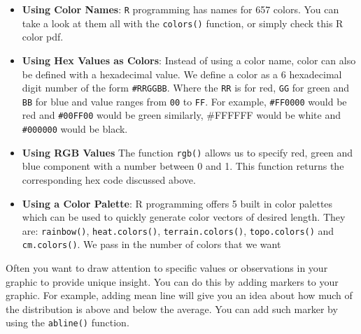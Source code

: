 \documentclass[
]{book}
\newenvironment{Shaded}{\begin{snugshade}}{\end{snugshade}}
\newcommand{\DataTypeTok}[1]{\textcolor[rgb]{0.13,0.29,0.53}{#1}}
\newcommand{\DecValTok}[1]{\textcolor[rgb]{0.00,0.00,0.81}{#1}}
\newcommand{\KeywordTok}[1]{\textcolor[rgb]{0.13,0.29,0.53}{\textbf{#1}}}
\newcommand{\NormalTok}[1]{#1}
\newcommand{\OperatorTok}[1]{\textcolor[rgb]{0.81,0.36,0.00}{\textbf{#1}}}
\newcommand{\StringTok}[1]{\textcolor[rgb]{0.31,0.60,0.02}{#1}}
\begin{document}
\begin{itemize}
\item
  \textbf{Using Color Names}: \texttt{R} programming has names for 657 colors. You can take a look at them all with the \texttt{colors()} function, or simply check this R color pdf.
\item
  \textbf{Using Hex Values as Colors}: Instead of using a color name, color can also be defined with a hexadecimal value. We define a color as a 6 hexadecimal digit number of the form \texttt{\#RRGGBB}. Where the \texttt{RR} is for red, \texttt{GG} for green and \texttt{BB} for blue and value ranges from \texttt{00} to \texttt{FF}. For example, \texttt{\#FF0000} would be red and \texttt{\#00FF00} would be green similarly, \#FFFFFF would be white and \texttt{\#000000} would be black.
\item
  \textbf{Using RGB Values} The function \texttt{rgb()} allows us to specify red, green and blue component with a number between 0 and 1. This function returns the corresponding hex code discussed above.
\item
  \textbf{Using a Color Palette}: R programming offers 5 built in color palettes which can be used to quickly generate color vectors of desired length. They are: \texttt{rainbow()}, \texttt{heat.colors()}, \texttt{terrain.colors()}, \texttt{topo.colors()} and \texttt{cm.colors()}. We pass in the number of colors that we want
\end{itemize}

Often you want to draw attention to specific values or observations in your graphic to provide unique insight. You can do this by adding markers to your graphic. For example, adding mean line will give you an idea about how much of the distribution is above and below the average. You can add such marker by using the \texttt{abline()} function.

\begin{Shaded}
\end{Shaded}
\end{document}
